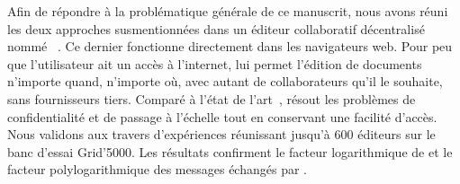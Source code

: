Afin de répondre à la problématique générale de ce manuscrit, nous avons réuni
les deux approches susmentionnées dans un éditeur collaboratif décentralisé
nommé \CRATE~\cite{nedelec2016crate}. Ce dernier fonctionne directement dans les
navigateurs web. Pour peu que l'utilisateur ait un accès à l'internet, \CRATE
lui permet l'édition de documents n'importe quand, n'importe où, avec autant de
collaborateurs qu'il le souhaite, sans fournisseurs tiers. Comparé à l'état de
l'art~\cite{etherpad, googledocs, hivejs, lautamaki2012cored,
  nicolaescu2015yjs}, \CRATE résout les problèmes de confidentialité et de
passage à l'échelle tout en conservant une facilité d'accès. Nous validons
\CRATE aux travers d'expériences réunissant jusqu'à 600 éditeurs sur le banc
d'essai Grid'5000. Les résultats confirment le facteur logarithmique de \SPRAY
et le facteur polylogarithmique des messages échangés par \LSEQ.



